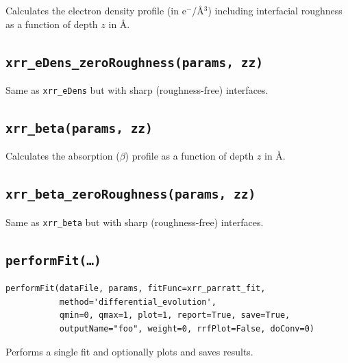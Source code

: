 \documentclass[11pt,a4paper]{article}
\begin{document}
Calculates the electron density profile (in e$^-$/\AA$^3$) including interfacial roughness
as a function of depth $z$ in \AA.

\subsection*{\texttt{xrr\_eDens\_zeroRoughness(params, zz)}}

Same as \texttt{xrr\_eDens} but with sharp (roughness-free) interfaces.

\subsection*{\texttt{xrr\_beta(params, zz)}}

Calculates the absorption ($\beta$) profile as a function of depth $z$ in \AA.

\subsection*{\texttt{xrr\_beta\_zeroRoughness(params, zz)}}

Same as \texttt{xrr\_beta} but with sharp (roughness-free) interfaces.

\subsection*{\texttt{performFit(\ldots)}}

\begin{verbatim}
performFit(dataFile, params, fitFunc=xrr_parratt_fit,
           method='differential_evolution',
           qmin=0, qmax=1, plot=1, report=True, save=True,
           outputName="foo", weight=0, rrfPlot=False, doConv=0)
\end{verbatim}

Performs a single fit and optionally plots and saves results.
\end{document}
